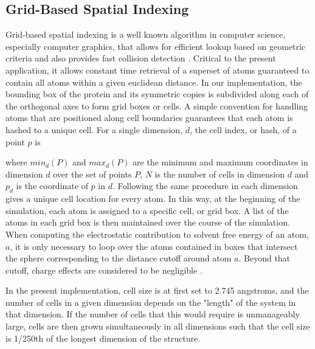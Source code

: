 \subsection*{Grid-Based Spatial Indexing}
\label{subsec:grid_based_indexing}
Grid-based spatial indexing is a well known algorithm in computer science, especially computer graphics, that allows for efficient lookup based on geometric criteria and also provides fast collision detection \cite{bentley1979data}.
Critical to the present application, it allows constant time retrieval of a superset of atoms guaranteed to contain all atoms within a given euclidean distance.
In our implementation, the bounding box of the protein and its symmetric copies is subdivided along each of the orthogonal axes to form grid boxes or cells.
A simple convention for handling atoms that are positioned along cell boundaries guarantees that each atom is hashed to a unique cell.
For a single dimension, $d$, the cell index, or hash, of a point $p$ is 

where $min_d(P)$ and $max_d(P)$ are the minimum and maximum coordinates in dimension $d$ over the set of points $P$, $N$ is the number of cells in dimension $d$ and $p_{d}$ is the coordinate of $p$ in $d$.
Following the same procedure in each dimension gives a unique cell location for every atom.
In this way, at the beginning of the simulation, each atom is assigned to a specific cell, or grid box.
A list of the atoms in each grid box is then maintained over the course of the simulation.
When computing the electrostatic contribution to solvent free energy of an atom, $a$, it is only necessary to loop over the atoms contained in boxes that intersect the sphere corresponding to the distance cutoff around atom $a$. 
Beyond that cutoff, charge effects are considered to be negligible \cite{gallicchio2004agbnp}.

In the present implementation, cell size is at first set to 2.745 angstroms, and the number of cells in a given dimension depends on the "length" of the system in that dimension.
If the number of cells that this would require is unmanageably large, cells are then grown simultaneously in all dimensions such that the cell size is 1/250th of the longest dimension of the structure.


